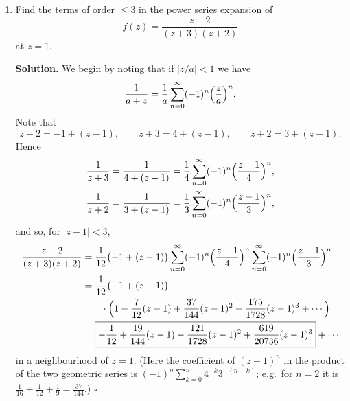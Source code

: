 \documentclass[12pt, reqno]{amsart}
\theoremstyle{definition}
\newenvironment{solution}
  {\par\smallskip\begin{tcolorbox}[breakable, enhanced, colback=solblue, colframe=solframe,
     boxrule=0.5pt, arc=2pt, left=6pt, right=6pt, top=4pt, bottom=4pt]\noindent\textbf{Solution.}}
  {\hfill$\square$\end{tcolorbox}\par\medskip}
\numberwithin{equation}{subsection}
\numberwithin{equation}{section}
\begin{document}
\begin{enumerate}
\begin{solution}
Apply \eqref{sbp} to $\sum_{n=1}^N\frac1n z^n$ with $a_n=1/n$ and $b_n=z^n$. As $z\neq1$ we may write
$B_n=\frac{z-z^{n+1}}{1-z}$, and since $a_{n+1}-a_n=-\frac{1}{n(n+1)}$, we obtain
\[
\sum_{n=1}^N\frac1n z^n=\frac{1}{1-z}\cdot\frac{z-z^{N+1}}{N}+\frac{1}{1-z}\sum_{n=1}^{N-1}\frac{z-z^{n+1}}{n(n+1)} .
\]
Now if $z$ is on the unit circle we have $|z-z^k|\leq2$ for any integer $k$. Hence the first term is bounded in norm by
$\frac{2}{|1-z|N}$, which tends to $0$ as $N\to\infty$. In the second term, the $n$-th summand of the sum is bounded in norm by
$\frac{2}{n(n+1)}$, and $\sum\frac{2}{n(n+1)}$ converges (it telescopes: $\frac1{n(n+1)}=\frac1n-\frac1{n+1}$). So the series
$\sum_{n\geq1}\frac{z-z^{n+1}}{n(n+1)}$ converges absolutely. Letting $N\to\infty$, the partial sums
$\sum_{n=1}^N\frac{z^n}{n}$ converge, i.e.\ $\sum\frac{z^n}{n}$ converges at every $z\neq1$ with $|z|=1$.
\end{solution}

\item Find the terms of order $\leq 3$ in the power series expansion of
\[
f(z)=\frac{z-2}{(z+3)(z+2)}
\]
at $z=1$.

\begin{solution}
We begin by noting that if $|z/a|<1$ we have
\[
\frac{1}{a+z}=\frac1a\sum_{n=0}^{\infty}(-1)^n\Bigl(\frac za\Bigr)^n .
\]
Note that
\[
z-2=-1+(z-1),\qquad z+3=4+(z-1),\qquad z+2=3+(z-1).
\]
Hence
\begin{align*}
\frac{1}{z+3}&=\frac{1}{4+(z-1)}=\frac14\sum_{n=0}^{\infty}(-1)^n\Bigl(\frac{z-1}{4}\Bigr)^n,\\
\frac{1}{z+2}&=\frac{1}{3+(z-1)}=\frac13\sum_{n=0}^{\infty}(-1)^n\Bigl(\frac{z-1}{3}\Bigr)^n,
\end{align*}
and so, for $|z-1|<3$,
\begin{align*}
\frac{z-2}{(z+3)(z+2)}&=\frac1{12}\bigl(-1+(z-1)\bigr)\sum_{n=0}^{\infty}(-1)^n\Bigl(\frac{z-1}{4}\Bigr)^n\sum_{n=0}^{\infty}(-1)^n\Bigl(\frac{z-1}{3}\Bigr)^n\\
&=\frac1{12}\bigl(-1+(z-1)\bigr)\\
&\qquad\cdot\Bigl(1-\frac{7}{12}(z-1)+\frac{37}{144}(z-1)^2-\frac{175}{1728}(z-1)^3+\cdots\Bigr)\\
&=\boxed{-\frac1{12}+\frac{19}{144}(z-1)-\frac{121}{1728}(z-1)^2+\frac{619}{20736}(z-1)^3}+\cdots
\end{align*}
in a neighbourhood of $z=1$. (Here the coefficient of $(z-1)^n$ in the product of the two geometric series is
$(-1)^n\sum_{k=0}^n4^{-k}3^{-(n-k)}$; e.g.\ for $n=2$ it is $\frac1{16}+\frac1{12}+\frac19=\frac{37}{144}$.)
\end{solution}

\end{enumerate}
\end{document}

